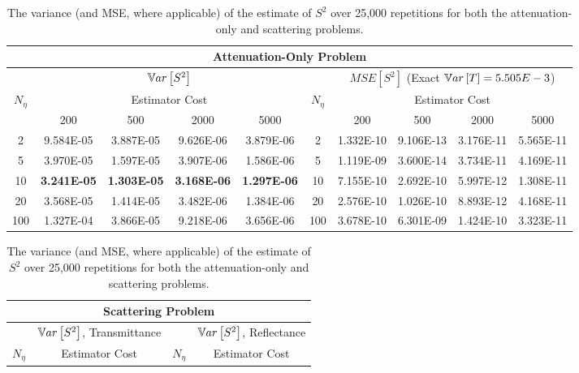 \begin{landscape}
\begin{table}[]
	\centering
	\caption{The variance (and MSE, where applicable) of the estimate of $S^2$ over 25,000 repetitions for both the attenuation-only and scattering problems.}
	\label{tab:results}
	\begin{tabular}{|c|cccc||c|cccc|}\hline
	\multicolumn{10}{|c|}{Attenuation-Only Problem} \\ \hline
	\multicolumn{1}{|c|}{} & \multicolumn{4}{|c||}{$\mathbb{V}ar\left[S^2\right]$} & \multicolumn{1}{|c|}{} & \multicolumn{4}{c|}{$MSE[S^2]$ (Exact $\mathbb{V}ar\left[T\right] = 5.505E-3$) } \\ \hline
	\multirow{2}{*}{$N_\eta$}& \multicolumn{4}{c||}{Estimator Cost} & \multirow{2}{*}{$N_\eta$} & \multicolumn{4}{|c|}{Estimator Cost} \\
	   	& 200 		& 500 		& 2000 		& 5000 		&		& 200 			& 500 			& 2000 			& 5000 \\ \hline
	2	& 9.584E-05	& 3.887E-05	& 9.626E-06	& 3.879E-06	& 2		& 1.332E-10		& 9.106E-13		& 3.176E-11		& 5.565E-11 \\
	5	& 3.970E-05	& 1.597E-05	& 3.907E-06	& 1.586E-06	& 5		& 1.119E-09		& 3.600E-14		& 3.734E-11		& 4.169E-11 \\
	10	& \textbf{3.241E-05} & \textbf{1.303E-05} & \textbf{3.168E-06} & \textbf{1.297E-06} & 10 & 7.155E-10	& 2.692E-10 	& 5.997E-12 	& 1.308E-11 \\
	20	& 3.568E-05	& 1.414E-05	& 3.482E-06	& 1.384E-06	& 20		& 2.576E-10		& 1.026E-10		& 8.893E-12 		& 4.168E-11 \\
	100	& 1.327E-04	& 3.866E-05 	& 9.218E-06	& 3.656E-06	& 100	& 3.678E-10		& 6.301E-09		& 1.424E-10		& 3.323E-11 \\
	\hline 
	\end{tabular}
	\begin{tabular}{|c|cccc||c|cccc|}\hline
	\multicolumn{10}{|c|}{Scattering Problem} \\ \hline
	\multicolumn{1}{|c|}{} & \multicolumn{4}{|c||}{$\mathbb{V}ar\left[S^2\right]$, Transmittance } & \multicolumn{1}{|c|}{} & \multicolumn{4}{c|}{$\mathbb{V}ar\left[S^2\right]$, Reflectance } \\ \hline
	\multirow{2}{*}{$N_\eta$}& \multicolumn{4}{c||}{Estimator Cost} & \multirow{2}{*}{$N_\eta$} & \multicolumn{4}{|c|}{Estimator Cost} \\

\end{tabular}
\end{table}
\end{landscape}
